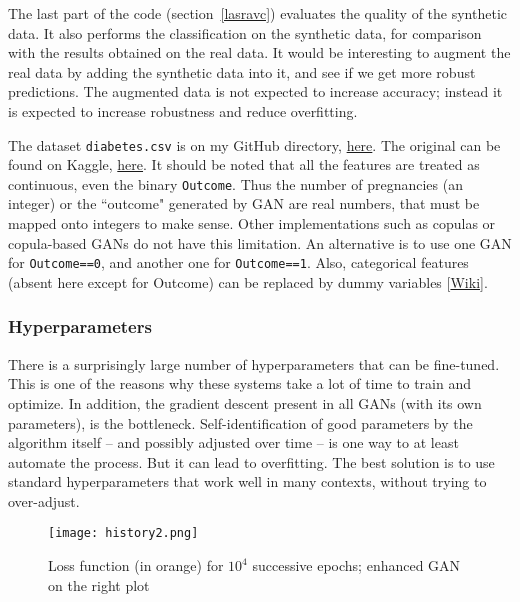 \documentclass[oneside,10pt]{book}
\begin{document}
The last part of the code (section~\ref{lasravc}) evaluates the quality of the synthetic data. It also performs the classification on the synthetic data, for comparison with the results obtained
on the real data. It would be interesting to augment the real data by adding the synthetic data into it, and see if we get more robust predictions.
The augmented data is not expected to increase accuracy; instead it is expected to increase robustness and reduce  \textcolor{index}{overfitting}.

The dataset \texttt{diabetes.csv} is on my GitHub directory, \href{https://github.com/VincentGranville/Main/blob/main/diabetes.csv}{here}.
The original can be found on Kaggle, \href{https://www.kaggle.com/uciml/pima-indians-diabetes-database}{here}. It should be
noted that all the features are treated as continuous, even the binary \texttt{Outcome}. Thus the number of pregnancies (an integer) or the ``outcome" generated by GAN
 are real numbers, that must be mapped onto integers to make sense. Other implementations such as copulas or copula-based GANs do not have
 this limitation. An alternative is to use one GAN for \texttt{Outcome==0}, and another one for \texttt{Outcome==1}. Also, categorical features (absent here except for Outcome) can be replaced
 by \textcolor{index}{dummy variables} [\href{https://en.wikipedia.org/wiki/Dummy_variable_(statistics)}{Wiki}].


\subsubsection{Hyperparameters}\label{fgdloo}

There is a surprisingly large number of hyperparameters that can be fine-tuned. This is one of the reasons why these systems take a lot of time
 to train and optimize. In addition, the gradient descent present in all GANs (with its own parameters), is the bottleneck. Self-identification of good parameters by the algorithm
 itself -- and possibly adjusted over time --  is one way to at least automate the process. But it can lead to overfitting. The best
 solution is to use standard hyperparameters that work well in many contexts, without trying to over-adjust.

\begin{figure}[H]
\centering
\texttt{[image: history2.png]}
\caption{Loss function (in orange) for $10^4$ successive epochs; enhanced GAN on the right plot}
\label{fig:pictty2xsvv}
\end{figure}
\end{document}
